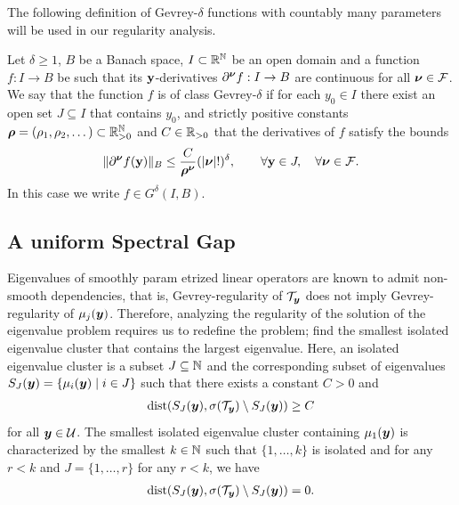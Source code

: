  The following definition of Gevrey-$\delta$ functions with countably many parameters will be used in our regularity analysis.
\begin{definition} \label{def:G-delta-def} 
	Let $\delta \geq 1$, $B$ be a Banach space, $I \subset \mathbb{R}^{\mathbb N}$ be an open domain and a function $f:I \to B$ be such that its ${\mathbf{y}}$-derivatives $\partial^{{\boldsymbol{\nu}}} f:I \to B$ are continuous for all ${\boldsymbol{\nu}} \in {\mathcal F}$. We say that the function $f$ is of class Gevrey-$\delta$ if for each $y_0 \in I$ there exist an open set $J\subseteq I$ that contains $y_0$, and strictly positive constants ${\boldsymbol{\rho}} = (\rho_1,\rho_2,\dots) \subset \mathbb{R}_{>0}^{{\mathbb N}}$ and $C \in \mathbb{R}_{>0}$ that the derivatives of $f$ satisfy the bounds
	\begin{equation}\label{G-delta-def}
		\|\partial^{{\boldsymbol{\nu}}} f({\mathbf{y}})\|_B \leq \frac{C}{{\boldsymbol{\rho}}^{{\boldsymbol{\nu}}}} (|{\boldsymbol{\nu}}|!)^\delta, \qquad \forall {\mathbf{y}} \in J, \quad \forall {\boldsymbol{\nu}} \in {\mathcal F}.
	\end{equation}
	In this case we write $f \in G^\delta(I,B)$.
\end{definition}


\subsection{A uniform Spectral Gap}\label{subsec:UniformSpectralGap}


Eigenvalues of smoothly param   etrized linear operators are known to admit non-smooth dependencies, that is, Gevrey-regularity of $\mathcal{T}_{\boldsymbol{y}}$ does not imply Gevrey-regularity of $\mu_j({\boldsymbol{y}})$. %
Therefore, analyzing the regularity of the solution of the eigenvalue problem requires us to redefine the problem; find the smallest isolated eigenvalue cluster that contains the largest eigenvalue.
Here, an isolated eigenvalue cluster is a subset $J \subseteq \mathbb{N}$ and the corresponding subset of eigenvalues  $S_J({\boldsymbol{y}}) = \{ \mu_i({\boldsymbol{y}})\mid i \in J \}$ such that there exists a constant $C>0$ and 
 \begin{align*}
     \textrm{dist}( S_J({\boldsymbol{y}}), \sigma(\mathcal{T}_{\boldsymbol{y}})\setminus S_J({\boldsymbol{y}}))  \geq C
 \end{align*} 
  for all ${\boldsymbol{y}} \in \mathcal{U}$. The smallest isolated eigenvalue cluster containing $\mu_1({\boldsymbol{y}})$ is characterized by the smallest $k \in \mathbb{N}$ such that $\{1,\ldots,k\}$ is isolated and for any $r  <k $ and $ J = \{1,\ldots, r\} $ for any $r  <k $, we have \begin{align*}
      \textrm{dist}( S_{J}({\boldsymbol{y}}), \sigma(\mathcal{T}_{\boldsymbol{y}})\setminus S_{J}({\boldsymbol{y}}))=0.
  \end{align*}
  

